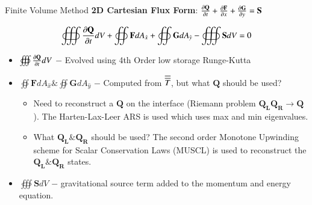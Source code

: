 \begin{frame}[t]{Finite Volume Method}
  \textbf{2D Cartesian Flux Form}: $\frac{\partial \mathbf{Q}}{\partial t} + \frac{\partial \mathbf{F}}{\partial x} + \frac{\partial \mathbf{G}}{\partial y} = \mathbf{S}$ 

\begin{equation*}
  \oiiint \pfrac{\mathbf{Q}}{t} dV + \oiint \mathbf F dA_{\hat{x}}  + \oiint \mathbf G dA_{\hat{y}} - \oiiint \mathbf{S} dV= 0
\end{equation*}

  \begin{itemize}
    \item  $\oiiint \pfrac{\mathbf{Q}}{t} dV$ $-$ Evolved using 4th Order low storage Runge-Kutta
    \item  $\oiint \mathbf F dA_{\hat{x}} \& \oiint \mathbf G dA_{\hat{y}}$ $-$ Computed from $\overline{\overline{T}}$, but what $\mathbf{Q}$ should be used?
      \begin{itemize}
        \item Need to reconstruct a $\mathbf{Q}$ on the interface (Riemann problem $\mathbf{Q_L}\mathbf{Q_R}\rightarrow\mathbf{Q}$). The Harten-Lax-Leer ARS is used which uses max and min eigenvalues.
        \item What $\mathbf{Q_L}\&\mathbf{Q_R}$ should be used? The second order Monotone Upwinding scheme for Scalar Conservation Laws (MUSCL) is used to reconstruct the $\mathbf{Q_L}\&\mathbf{Q_R}$ states.
      \end{itemize}
    \item $\oiiint \mathbf{S} dV$ $-$ gravitational source term added to the momentum and energy equation.
  \end{itemize}

\end{frame}

